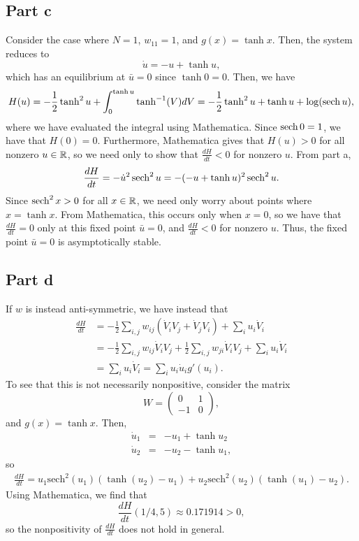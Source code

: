 \documentclass{article}
\begin{document}
\subsection{Part c}
Consider the case where $N=1$, $w_{11}=1$, and $g(x)=\tanh x$. Then, the system reduces to 
\[
\dot u=-u+\tanh u,
\]
which has an equilibrium at $\bar u=0$ since $\tanh0=0$. Then, we have 
\begin{align*}
H(u)=-\frac{1}{2}\tanh^2u+\int_{0}^{\tanh u}\tanh^{-1}(V)dV= -\frac{1}{2}\tanh^2u+\tanh u+\log (\operatorname{sech} u),
\end{align*}
where we have evaluated the integral using Mathematica. Since $\operatorname{sech}0=1$, we have that $H(0)=0$. Furthermore, Mathematica gives that $H(u)>0$ for all nonzero $u\in\mathbb{R}$, so we need only to show that $\frac{dH}{dt}<0$ for nonzero $u$. From part a, 
\begin{align*}
\frac{dH}{dt}=-\dot u^2\operatorname{sech}^2u=-(-u+\tanh u)^2\operatorname{sech}^2u.
\end{align*}
Since $\operatorname{sech}^2x>0$ for all $x\in\mathbb{R}$, we need only worry about points where $x=\tanh x$. From Mathematica, this occurs only when $x=0$, so we have that $\frac{dH}{dt}=0$ only at this fixed point $\bar u=0$, and $\frac{dH}{dt}<0$ for nonzero $u$. Thus, the fixed point $\bar u=0$ is asymptotically stable.

\subsection{Part d}
If $w$ is instead anti-symmetric, we have instead that 
\begin{align*}
	\frac{dH}{dt}&=-\frac{1}{2}\sum_{i,j}w_{ij}\left(\dot V_iV_j+\dot V_jV_i\right)+\sum_iu_i\dot V_i\\&=
	-\frac{1}{2}\sum_{i,j}w_{ij}\dot V_iV_j+\frac{1}{2}\sum_{i,j}w_{ji}\dot V_iV_j+\sum_iu_i\dot V_i\\&=
	\sum_iu_i\dot V_i=\sum_iu_i\dot u_ig'(u_i).
\end{align*}
To see that this is not necessarily nonpositive, consider the matrix
\[
W=\begin{pmatrix}
	0&1\\
	-1&0
\end{pmatrix},
\]
and $g(x)=\tanh x$. Then, 
\begin{eqnarray*} 
	\dot u_1 &=& -u_1+\tanh u_2  \\
	\dot u_2 &=& -u_2-\tanh u_1,
\end{eqnarray*}
so
\begin{align*}
\frac{dH}{dt}=u_1 \text{sech}^2(u_1) (\tanh (u_2)-u_1)+u_2 \text{sech}^2(u_2) (\tanh (u_1)-u_2).
\end{align*}
Using Mathematica, we find that 
\[
\frac{dH}{dt}(1/4,5)\approx0.171914>0,
\]
so the nonpositivity of $\frac{dH}{dt}$ does not hold in general.
\end{document}
